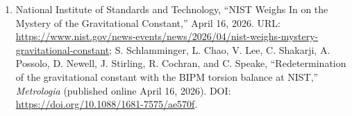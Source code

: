 \documentclass[
  11pt,
  letterpaper,
  twocolumn,
]{article}
\begin{document}
\begin{sloppypar}
\begin{enumerate}
  Gravitational constant and the Planck constant,'' accessed April 23,
  2026; archived snapshot:
  \url{https://web.archive.org/web/20250408212219/https://www.pas.rochester.edu/~mkal/};
  bundled local capture:
  \texttt{public\_proof\_package/\allowbreak kalinski\_rochester\_capture\_2026-04-23.md}.
\item
  National Institute of Standards and Technology, ``NIST Weighs In on
  the Mystery of the Gravitational Constant,'' April 16, 2026. URL:
  \url{https://www.nist.gov/news-events/news/2026/04/nist-weighs-mystery-gravitational-constant};
  S. Schlamminger, L. Chao, V. Lee, C. Shakarji, A. Possolo, D. Newell,
  J. Stirling, R. Cochran, and C. Speake, ``Redetermination of the
  gravitational constant with the BIPM torsion balance at NIST,''
  \emph{Metrologia} (published online April 16, 2026). DOI:
  \url{https://doi.org/10.1088/1681-7575/ae570f}.
\end{enumerate}
\end{sloppypar}
\end{document}
